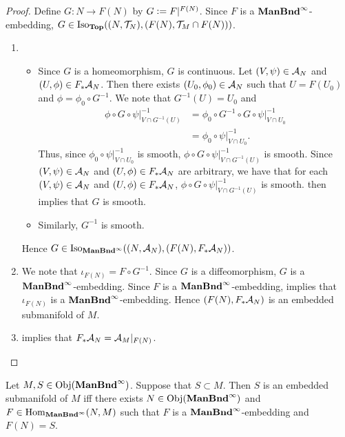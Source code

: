 \documentclass{book}
\begin{document}
	\begin{proof} Define $G:N \rightarrow F(N)$ by $G \vcentcolon= F|^{F(N)}$. Since $F$ is a $\operatorname*{\text{\textbf{ManBnd}}^{\infty}}$-embedding, $G \in \operatorname{Iso}_{\operatorname*{\text{\textbf{Top}}}}((N, \mathcal{T}_N), (F(N), \mathcal{T}_M \cap F(N)))$. 
		\begin{enumerate}
			\item 
			\begin{itemize}
				\item Since $G$ is a homeomorphism, $G$ is continuous. Let $(V, \psi) \in \mathcal{A}_N$ and $(U, \phi) \in F_*\mathcal{A}_N$. Then there exists $(U_0, \phi_0) \in \mathcal{A}_N$ such that $U = F(U_0)$ and $\phi = \phi_0 \circ G^{-1}$. We note that $G^{-1}(U) = U_0$ and 
				\begin{align*}
					\phi \circ G \circ \psi|_{V \cap G^{-1}(U)}^{-1}
					& = \phi_0 \circ G^{-1} \circ G \circ \psi|_{V \cap U_0}^{-1} \\
					& = \phi_0 \circ \psi|_{V \cap U_0}^{-1}. 
				\end{align*}
				Thus, since $\phi_0 \circ \psi|_{V \cap U_0}^{-1}$ is smooth, $\phi \circ G \circ \psi|_{V \cap G^{-1}(U)}^{-1}$ is smooth. Since $(V, \psi) \in \mathcal{A}_N$ and $(U, \phi) \in F_*\mathcal{A}_N$ are arbitrary, we have that for each $(V, \psi) \in \mathcal{A}_N$ and $(U, \phi) \in F_*\mathcal{A}_N$, $\phi \circ G \circ \psi|_{V \cap G^{-1}(U)}^{-1}$ is smooth.  then implies that $G$ is smooth. 
				\item Similarly, $G^{-1}$ is smooth.
			\end{itemize}
			Hence $G \in \operatorname{Iso}_{\operatorname*{\text{\textbf{ManBnd}}^{\infty}}}((N, \mathcal{A}_N), (F(N), F_*\mathcal{A}_N))$.
			\item We note that $\iota_{F(N)} = F \circ G^{-1}$. Since $G$ is a diffeomorphism, $G$ is a $\operatorname*{\text{\textbf{ManBnd}}^{\infty}}$-embedding. Since $F$ is a $\operatorname*{\text{\textbf{ManBnd}}^{\infty}}$-embedding, \rex{}  implies that $\iota_{F(N)}$ is a $\operatorname*{\text{\textbf{ManBnd}}^{\infty}}$-embedding. Hence $(F(N), F_*\mathcal{A}_N)$ is an embedded submanifold of $M$. 
			\item \rex{}  implies that $F_*\mathcal{A}_N = \mathcal{A}_M|_{F(N)}$.
		\end{enumerate}
	\end{proof}
	
	\begin{ex} 
		Let $M,S \in \operatorname{Obj}(\operatorname*{\text{\textbf{ManBnd}}^{\infty}})$. Suppose that $S \subset M$. Then $S$ is an embedded submanifold of $M$ iff there exists $N \in \operatorname{Obj}(\operatorname*{\text{\textbf{ManBnd}}^{\infty}})$ and $F \in \operatorname{Hom}_{\operatorname*{\text{\textbf{ManBnd}}^{\infty}}}(N, M)$ such that $F$ is a $\operatorname*{\text{\textbf{ManBnd}}^{\infty}}$-embedding and $F(N) = S$.
	\end{ex}	
	
\end{document}

